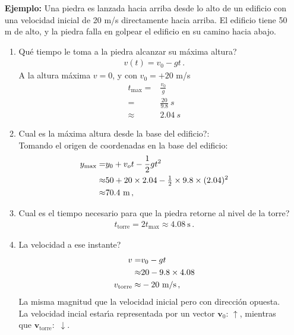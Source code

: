 \begin{itemize}
\item[\textbf{Ejemplo:}] Una piedra es lanzada hacia arriba desde lo alto de un edificio con una velocidad inicial de 20 m/s directamente hacia arriba. El edificio tiene 50 m de alto, y la piedra falla en golpear el edificio en su camino hacia abajo.
  \begin{enumerate}
  \item \textquestiondown Qu\'e tiempo le toma a la piedra alcanzar su m\'axima altura?
    \begin{align}
      v(t)=v_0-gt\,.
    \end{align}
    A la altura m\'axima $v=0$, y con $v_0=+20$ m/s
    \begin{align}
      t_{\text{max}}=&\frac{v_0}{g}\nonumber\\
      =&\frac{20}{9.8}\ s\nonumber\\
      \approx&2.04\ s
    \end{align}
  \item \textquestiondown Cual es la m\'axima altura desde la base del edificio?:\\
    Tomando el origen de coordenadas en la base del edificio:
    \begin{align}
      y_{\text{max}}=&y_0+v_o t-\frac{1}{2}g t^2\nonumber\\
      \approx&50+20\times2.04-\tfrac{1}{2}\times9.8\times(2.04)^2\nonumber\\
      \approx&70.4\ \text{m}\,,
    \end{align}
  \item \textquestiondown Cual es el tiempo necesario para que la piedra retorne al nivel de la torre?\\
    \begin{align}
      t_{\text{torre}}=2t_{\text{max}}\approx4.08\ \text{s}\,.
    \end{align}
  \item \textquestiondown La velocidad a ese instante?\\
    \begin{align}
      v=&v_0-gt\nonumber\\
      \approx&20-9.8\times4.08\\
      v_{\text{torre}}\approx&-20\ \text{m/s}\,,
    \end{align}
    La misma magnitud que la velocidad inicial pero con direcci\'on opuesta. La velocidad incial estar\'\i a representada por un vector $\mathbf{v}_0$: $\uparrow$, mientras que $\mathbf{v}_{\text{torre}}:$ $\downarrow$.

\end{enumerate}
\end{itemize}
